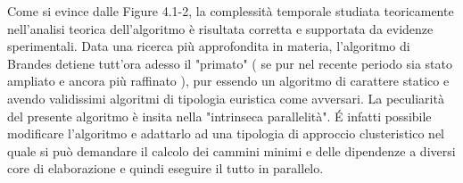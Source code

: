 \noindent Come si evince dalle Figure 4.1-2, la complessità temporale studiata teoricamente nell'analisi teorica dell'algoritmo è risultata corretta e supportata da evidenze sperimentali. Data una ricerca più approfondita in materia, l'algoritmo di Brandes detiene tutt'ora adesso il "primato" ( se pur nel recente periodo sia stato ampliato e ancora più raffinato ), pur essendo un algoritmo di carattere statico e avendo validissimi algoritmi di tipologia euristica come avversari. La peculiarità del presente algoritmo è insita nella "intrinseca parallelità". É infatti possibile modificare l'algoritmo e adattarlo ad una tipologia di approccio clusteristico nel quale si può demandare il calcolo dei cammini minimi e delle dipendenze a diversi core di elaborazione e quindi eseguire il tutto in parallelo.

